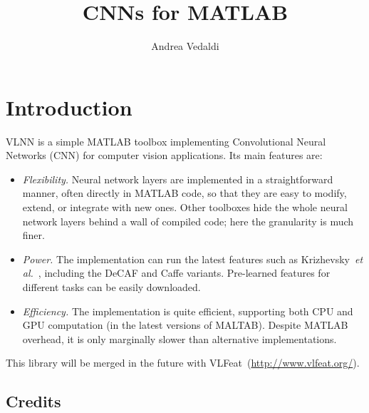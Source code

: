 \documentclass[12pt]{article}
\newcommand{\vlnn}{\textsf{VLNN}\xspace}
\begin{document}
\title{CNNs for MATLAB}
\author{Andrea Vedaldi}
\maketitle{}

\section{Introduction}

\vlnn is a simple MATLAB toolbox implementing Convolutional Neural Networks (CNN) for computer vision applications. Its main features are:
\begin{itemize}
\item \emph{Flexibility.} Neural network layers are implemented in a straightforward manner, often directly in MATLAB code, so that they are easy to modify, extend, or integrate with new ones. Other toolboxes hide the whole neural network layers behind a wall of compiled code; here the granularity is much finer.
\item \emph{Power.} The implementation can run the latest features such as Krizhevsky~\textit{et al.}~\cite{krizhevsky12imagenet}, including the DeCAF and Caffe variants. Pre-learned features for different tasks can be easily downloaded.
\item \emph{Efficiency.} The implementation is quite efficient, supporting both CPU and GPU computation (in the latest versions of MALTAB). Despite MATLAB overhead, it is only marginally slower than alternative implementations.
\end{itemize}
This library will be merged in the future with VLFeat~(\url{http://www.vlfeat.org/}).

\subsection{Credits}

\section{}
\end{document}
